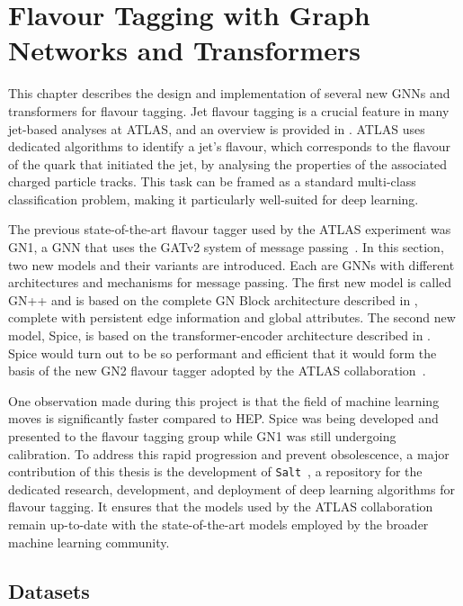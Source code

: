 
\chapter{Flavour Tagging with Graph Networks and Transformers}
\label{ch:spice}

This chapter describes the design and implementation of several new \Glspl{GNN} and transformers for flavour tagging.
Jet flavour tagging is a crucial feature in many jet-based analyses at \Gls{ATLAS}, and an overview is provided in .
\Gls{ATLAS} uses dedicated algorithms to identify a jet's flavour, which corresponds to the flavour of the quark that initiated the jet, by analysing the properties of the associated charged particle tracks.
This task can be framed as a standard multi-class classification problem, making it particularly well-suited for deep learning.

The previous state-of-the-art flavour tagger used by the \Gls{ATLAS} experiment was \Gls{GN1}, a GNN that uses the GATv2 system of message passing~\cite{GATv2}.
In this section, two new models and their variants are introduced.
Each are \Glspl{GNN} with different architectures and mechanisms for message passing.
The first new model is called \Gls{GN++} and is based on the complete GN Block architecture described in , complete with persistent edge information and global attributes.
The second new model, Spice, is based on the transformer-encoder architecture described in .
Spice would turn out to be so performant and efficient that it would form the basis of the new GN2 flavour tagger adopted by the \Gls{ATLAS} collaboration~\cite{GN2Plots}.

One observation made during this project is that the field of machine learning moves is significantly faster compared to HEP.
Spice was being developed and presented to the flavour tagging group while \Gls{GN1} was still undergoing calibration.
To address this rapid progression and prevent obsolescence, a major contribution of this thesis is the development of \texttt{Salt}~\cite{Salt}, a repository for the dedicated research, development, and deployment of deep learning algorithms for flavour tagging.
It ensures that the models used by the \Gls{ATLAS} collaboration remain up-to-date with the state-of-the-art models employed by the broader machine learning community.

\section{Datasets}

